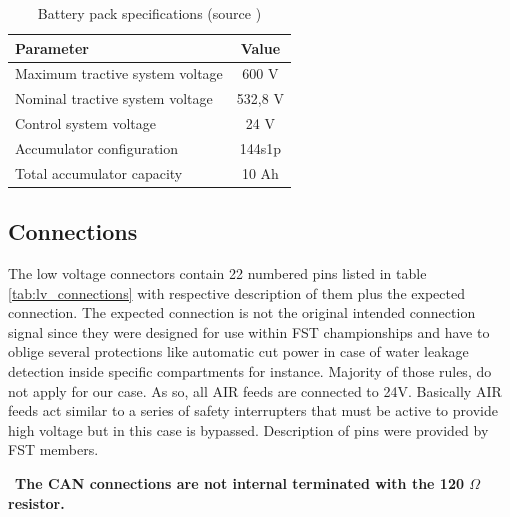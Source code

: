 \begin{table}
	\centering
	\begin{tabular}{lc}
		\toprule
		\textbf{Parameter} & \textbf{Value}\\
		\midrule
		Maximum tractive system voltage & 600 V \\
		Nominal tractive system voltage & 532,8 V \\
		Control system voltage & 24 V \\
		Accumulator configuration & 144s1p \\
		Total accumulator capacity & 10 Ah\\
		\bottomrule
	\end{tabular}
	\caption[Battery pack specifications]{Battery pack specifications (source \cite{fst06})}
	\label{tab:battery_pack_specs}
\end{table}

\subsection{Connections}
The low voltage connectors contain 22 numbered pins listed in table \ref{tab:lv_connections} with respective description of them plus the expected connection. The expected connection is not the original intended connection signal since they were designed for use within \gls{FST} championships and have to oblige several protections like automatic cut power in case of water leakage detection inside specific compartments for instance. Majority of those rules, do not apply for our case. As so, all \gls{AIR} feeds are connected to 24V. Basically \gls{AIR} feeds act similar to a series of safety interrupters that must be active to provide high voltage but in this case is bypassed. Description of pins were provided by \gls{FST} members.

\begin{mdframed}[backgroundcolor=red!20, roundcorner=10pt, innertopmargin=5pt, innerbottommargin=5pt, skipabove=5pt]
	\Warning \, \textbf{The CAN connections are not internal terminated with the 120 $\Omega$ resistor.}
\end{mdframed}

